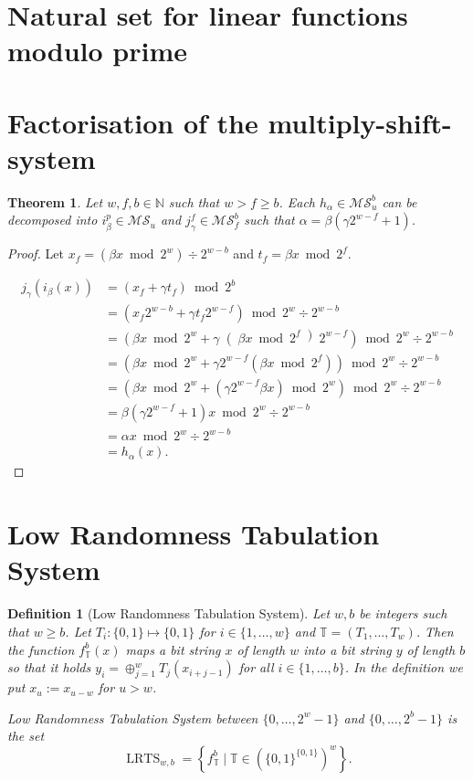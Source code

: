 \documentclass{article}
\newtheorem{theorem}{Theorem}
\newtheorem{definition}{Definition}
\begin{document}
\section{Natural set for linear functions modulo prime}

\section{Factorisation of the multiply-shift-system}

\begin{theorem}
Let $w, f, b \in \mathbb{N}$ such that $w > f \geq b$.
Each $h_\alpha \in \mathcal{MS}_{u}^{b}$ can be decomposed into $i_\beta^{p} \in \mathcal{MS}_{u}$ and $j_\gamma^{f} \in \mathcal{MS}_{f}^{b}$ such that $\alpha = \beta (\gamma 2 ^ {w - f} + 1)$.
\end{theorem}
\begin{proof}
Let $x_f = (\beta x \bmod 2^w) \div 2^{w - b}$ and $t_f = \beta x \bmod 2^f$.

\begin{align*}
j_\gamma(i_\beta(x)) & = \left(x_f + \gamma t_f\right) \bmod 2^b \\
	& = \left(x_f 2^{w-b} + \gamma t_f 2^{w-f}\right) \bmod 2^w \div 2^{w-b} \\
	& = \left(\beta x \bmod 2^w + \gamma \right(\beta x \bmod 2^f\left) 2^{w-f}\right) \bmod 2^w \div 2^{w-b} \\
	& = \left(\beta x \bmod 2^w + \gamma 2^{w-f} \left(\beta x \bmod 2^f\right)\right) \bmod 2^w \div 2^{w-b} \\
	& = \left(\beta x \bmod 2^w + \left(\gamma 2^{w-f}\beta x\right) \bmod 2^w\right) \bmod 2^w \div 2^{w-b} \\
	& = \beta \left(\gamma 2^{w - f} + 1\right) x \bmod 2^w \div 2^{w - b} \\
	& = \alpha x \bmod 2^w \div 2^{w - b} \\
	& = h_\alpha(x).
\end{align*}
\end{proof}

\section*{Low Randomness Tabulation System}

\begin{definition}[Low Randomness Tabulation System]
Let $w, b$ be integers such that $w \geq b$.
Let $T_i\colon \{0, 1\} \mapsto \{0, 1\}$ for $i \in \{1, \dots, w\}$ and $\mathbb{T} = (T_1, \dots, T_w)$.
Then the function $f_\mathbb{T}^b (x)$ maps a bit string $x$ of length $w$ into a bit string $y$ of length $b$ so that it holds $y_i = \oplus_{j=1}^{w} T_j(x_{i + j - 1}) $ for all $i \in \{1, \dots, b\}$.
In the definition we put $x_{u} := x_{u - w}$ for $u > w$.

\emph{Low Randomness Tabulation System} between $\{0, \dots, 2^w - 1\}$ and $\{0, \dots, 2^b - 1\}$ is the set \[\operatorname{LRTS}_{w, b} = \left\{f_\mathbb{T}^b \mid \mathbb{T} \in \left( \{0, 1\}^{\{0, 1\}} \right)^w\right\}.\]
\end{definition}
\end{document}
